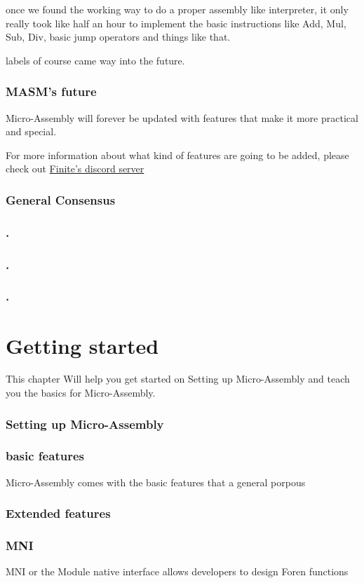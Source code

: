 \documentclass[a4paper,11pt]{book}
\begin{document}
once we found the working way to do a proper assembly like interpreter, it only really took like half an hour to implement the basic instructions like Add, Mul, Sub, Div, basic jump operators and things like that.

labels of course came way into the future.

\subsection{MASM's future}
Micro-Assembly will forever be updated with features that make it more practical and special.

For more information about what kind of features are going to be added, please check out
\hyperref{https://discord.finite.ovh}{}{}{Finite's discord server}


\subsection{General Consensus}
\subsection{.}
\subsection{.}
\subsection{.}

\chapter{Getting started}
This chapter Will help you get started on Setting up Micro-Assembly and teach you the basics for Micro-Assembly.
\subsection{Setting up Micro-Assembly}\label{setup:masm}
\subsection{basic features}
Micro-Assembly comes with the basic features that a general porpous	
\subsection{Extended features}
\subsection{MNI}\label{subpar:MNI}
MNI or the Module native interface allows developers to design Foren functions
\end{document}
